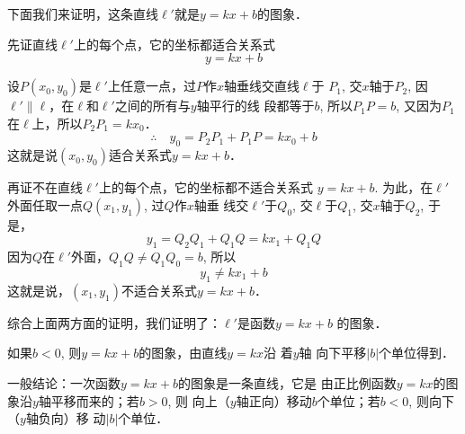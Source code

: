 \begin{figure}[htp]
    \centering
{}
    \caption{}
\end{figure}

下面我们来证明，这条直线$\ell'$就是$y=kx+b$的图象．

先证直线$\ell'$上的每个点，它的坐标都适合关系式
\[y=kx+b\]

设$P(x_0,y_0)$是$\ell'$上任意一点，过$P$作$x$轴垂线交直线$\ell$于
$P_1$, 交$x$轴于$P_2$, 因$\ell'\parallel \ell$，在$\ell$和$\ell'$之间的所有与$y$轴平行的线
段都等于$b$, 所以$P_1P=b$, 又因为$P_1$在$\ell$上，所以$P_2P_1=kx_0$．
\[\therefore\quad y_0=P_2P_1+P_1P=kx_0+b\]
这就是说$(x_0,y_0)$适合关系式$y=kx+b$．

再证不在直线$\ell'$上的每个点，它的坐标都不适合关系式
$y=kx+b$. 为此，在$\ell'$外面任取一点$Q(x_1,y_1)$, 过$Q$作$x$轴垂
线交$\ell'$于$Q_0$, 交$\ell$于$Q_1$, 交$x$轴于$Q_2$, 于是，
\[y_1=Q_2Q_1+Q_1Q=kx_1+Q_1Q\]
因为$Q$在$\ell'$外面，$Q_1Q\ne Q_1Q_0=b$, 所以
\[y_1\ne kx_1+b\]
这就是说，$(x_1,y_1)$不适合关系式$y=kx+b$．

综合上面两方面的证明，我们证明了：$\ell'$是函数$y=kx+b$
的图象．

如果$b<0$, 则$y=kx+b$的图象，由直线$y=kx$沿 着$y$轴
向下平移$|b|$个单位得到．

一般结论：一次函数$y=kx+b$的图象是一条直线，它是
由正比例函数$y=kx$的图象沿$y$轴平移而来的；若$b>0$, 则
向上（$y$轴正向）移动$b$个单位；若$b<0$, 则向下（$y$轴负向）移
动$|b|$个单位．

